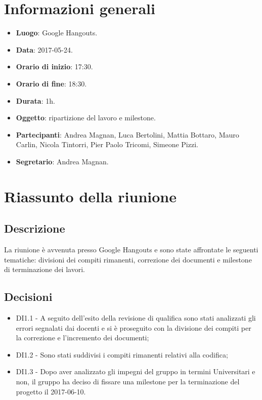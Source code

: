 \documentclass[a4paper,titlepage]{article}
\begin{document}
\maketitle
\begin{diario}
\end{diario}
\newpage
\tableofcontents

\newpage
\section{Informazioni generali}
\label{sec:Informazioni}

\begin{itemize}
  \item \textbf{Luogo}: Google Hangouts.
  \item \textbf{Data}: 2017-05-24.
  \item \textbf{Orario di inizio}: 17:30.
  \item \textbf{Orario di fine}: 18:30.
  \item \textbf{Durata}: 1h.
  \item \textbf{Oggetto}: ripartizione del lavoro e milestone.
  \item \textbf{Partecipanti}: Andrea Magnan, Luca Bertolini, Mattia Bottaro, Mauro Carlin, Nicola Tintorri, Pier Paolo Tricomi, Simeone Pizzi.
  \item \textbf{Segretario}: Andrea Magnan.

\end{itemize}
\section{Riassunto della riunione}
\label{sec:RiassuntoRiunione}
 \subsection{Descrizione}
La riunione è avvenuta presso Google Hangouts e sono state affrontate le seguenti tematiche: divisioni dei compiti rimanenti, correzione dei documenti e milestone di terminazione dei lavori.
 \subsection{Decisioni}
 \begin{itemize}
  \item DI1.1 - A seguito dell'esito della revisione di qualifica sono stati analizzati gli errori segnalati dai docenti e si è proseguito con la divisione dei compiti per la correzione e l'incremento dei documenti;
  \item DI1.2 - Sono stati suddivisi i compiti rimanenti relativi alla codifica;
  \item DI1.3 - Dopo aver analizzato gli impegni del gruppo in termini Universitari e non, il gruppo ha deciso di fissare una milestone per la terminazione del progetto il 2017-06-10.
 \end{itemize}
\end{document}
